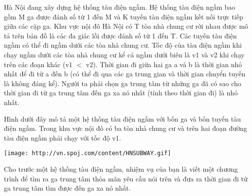 Hà Nội đang xây dựng hệ thống tàu điện ngầm. Hệ thống tàu điện ngầm bao gồm M ga được đánh số từ 1 đến M và K tuyến tàu điện ngầm kết nối trực tiếp giữa các cặp ga. Khu vực nội đô Hà Nội có T tòa nhà chung cư rời nhau được mô tả trên bản đồ là các đa giác lồi được đánh số từ 1 đến T. Các tuyến tàu điện ngầm có thể đi ngầm dưới các tòa nhà chung cư.  Tốc độ của tàu điện ngầm khi chạy ngầm dưới các tòa nhà chung cư kể cả ngầm dưới biên là v1 và v2 khi chạy trên các đoạn khác (v1 $<$ v2). Thời gian đi giữa hai ga a và b là thời gian nhỏ nhất để đi từ a đến b (có thể đi qua các ga trung gian và thời gian chuyển tuyến là không đáng kể). Người ta phải chọn ga trung tâm từ những ga đã có sao cho thời gian đi từ ga trung tâm đến ga xa nó nhất (tính theo thời gian đi) là nhỏ nhất.  

   Hình dưới đây mô tả một hệ thống tàu điện ngầm với bốn ga và bốn tuyến tàu điện ngầm. Trong khu vực nội đô có ba tòa nhà chung cư và trên hai đoạn đường tàu điện ngầm phải chạy với tốc độ v1.  


\texttt{[image: http://vn.spoj.com/content/HNSUBWAY.gif]}

   Cho trước một hệ thống tàu điện ngầm, nhiệm vụ của bạn là viết một chương trình để tìm ra ga trung tâm thỏa mãn yêu cầu nói trên và đưa ra thời gian đi từ ga trung tâm tìm được đến ga xa nó nhất.